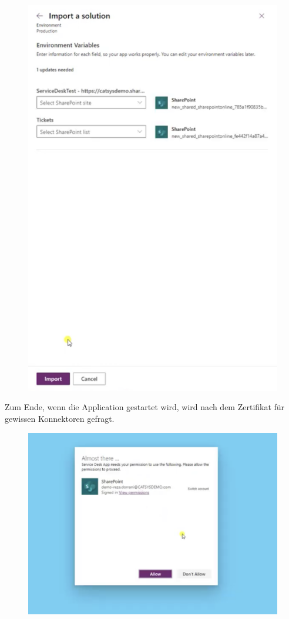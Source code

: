 \begin{figure}[H]
	\centering
	\includegraphics[scale = 0.3]{attachment/chapter_13/Scc064}
\end{figure}

Zum Ende, wenn die Application gestartet wird, wird nach dem Zertifikat für gewissen Konnektoren gefragt.

\begin{figure}[H]
	\centering
	\includegraphics[scale = 0.3]{attachment/chapter_13/Scc065}
\end{figure}